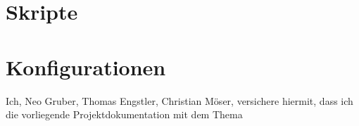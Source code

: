 \documentclass[
		abstract=false,
		appendixprefix=true,		  
		a4paper,                  %
		10pt,                     %
		headings=normal,          %
		chapterprefix=false,      %
		oneside,
		openright,                %
		titlepage,                %
		listof=totoc,             %
		headsepline,              %
		plainheadsepline,         %
		bibliography=totoc,       %
		parskip=half-,						%
		numbers=noenddot					%
	]{scrreprt}                 %
\newcommand{\art}{Projektdokumentation}
\newcommand{\autor}{Neo Gruber, Thomas Engstler, Christian Möser}
\begin{document}
\setcounter{page}{1}
\begin{onehalfspace}




%
%


\end{onehalfspace}



\setcounter{page}{\value{exterior}}

\nocite{*} %



\clearpage
\begin{appendix} 
	\chapter{Skripte}
%	
%	
%	
	\chapter{Konfigurationen}
%	
%	



\end{appendix}
\clearpage

Ich, \autor, versichere hiermit, dass ich die vorliegende \art  { }mit dem Thema
\end{document}
